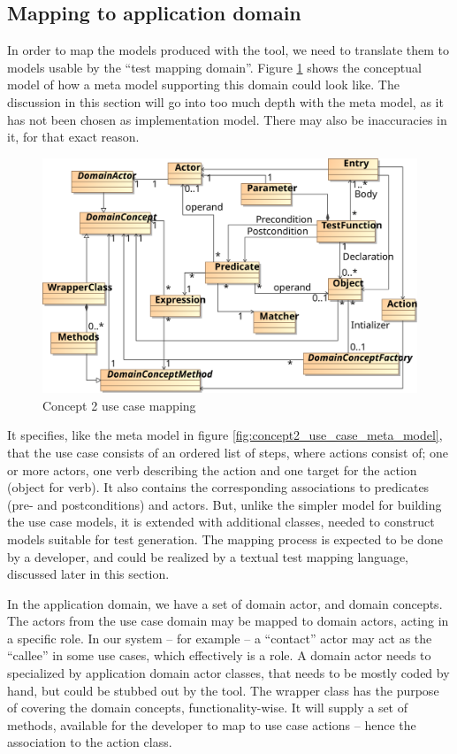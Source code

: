 \subsection{Mapping to application domain}
In order to map the models produced with the tool, we need to translate them to models usable by the ``test mapping domain''. Figure \ref{fig:concept2_use_case_mapping} shows the conceptual model of how a meta model supporting this domain could look like. The discussion in this section will go into too much depth with the meta model, as it has not been chosen as implementation model. There may also be inaccuracies in it, for that exact reason.
\begin{figure}[!htbp]
  \centering
  \includegraphics[scale=0.72]{img/concept2_use_case_mapping}
  \caption{Concept 2 use case mapping}
  \label{fig:concept2_use_case_mapping}
\end{figure}It specifies, like the meta model in figure \ref{fig:concept2_use_case_meta_model}, that the use case consists of an ordered list of steps, where actions consist of; one or more actors, one verb describing the action and one target for the action (object for verb). It also contains the corresponding associations to predicates (pre- and postconditions) and actors. But, unlike the simpler model for building the use case models, it is extended with additional classes, needed to construct models suitable for test generation. The mapping process is expected to be done by a developer, and could be realized by a textual test mapping language, discussed later in this section.\medskip

\noindent In the application domain, we have a set of domain actor, and domain concepts. The actors from the use case domain may be mapped to domain actors, acting in a specific role. In our system -- for example -- a ``contact'' actor may act as the ``callee'' in some use cases, which effectively is a role. A domain actor needs to specialized by application domain actor classes, that needs to be mostly coded by hand, but could be stubbed out by the tool. The wrapper class has the purpose of covering the domain concepts, functionality-wise. It will supply a set of methods, available for the developer to map to use case actions -- hence the association to the action class.\medskip

